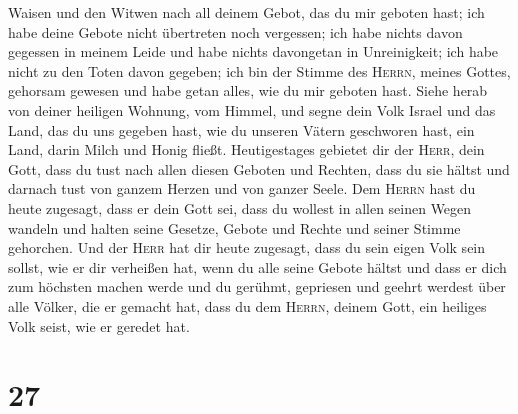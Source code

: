 Waisen und den Witwen nach all deinem Gebot, das du mir geboten hast;
ich habe deine Gebote nicht übertreten noch vergessen; 
ich habe nichts davon gegessen in meinem Leide und habe nichts
davongetan in Unreinigkeit; ich habe nicht zu den Toten davon gegeben;
ich bin der Stimme des \textsc{Herrn}, meines Gottes, gehorsam gewesen
und habe getan alles, wie du mir geboten hast.  Siehe
herab von deiner heiligen Wohnung, vom Himmel, und segne dein Volk
Israel und das Land, das du uns gegeben hast, wie du unseren Vätern
geschworen hast, ein Land, darin Milch und Honig fließt. 
Heutigestages gebietet dir der \textsc{Herr}, dein Gott, dass du tust
nach allen diesen Geboten und Rechten, dass du sie hältst und darnach
tust von ganzem Herzen und von ganzer Seele.  Dem
\textsc{Herrn} hast du heute zugesagt, dass er dein Gott sei, dass du
wollest in allen seinen Wegen wandeln und halten seine Gesetze, Gebote
und Rechte und seiner Stimme gehorchen.  Und der
\textsc{Herr} hat dir heute zugesagt, dass du sein eigen Volk sein
sollst, wie er dir verheißen hat, wenn du alle seine Gebote hältst
 und dass er dich zum höchsten machen werde und du
gerühmt, gepriesen und geehrt werdest über alle Völker, die er gemacht
hat, dass du dem \textsc{Herrn}, deinem Gott, ein heiliges Volk seist,
wie er geredet hat.

\hypertarget{section-26}{%
\section{27}\label{section-26}}

